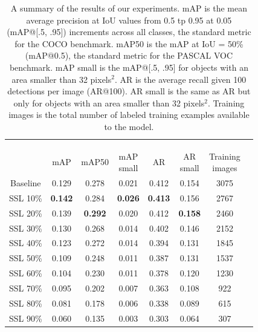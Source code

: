 \documentclass[conference]{IEEEtran}
\begin{document}

\begin{table}[h]
\renewcommand{\arraystretch}{1.3}
\caption{A summary of the results of our experiments. mAP is the mean average precision at IoU values from 0.5 tp 0.95 at 0.05 (mAP@[.5, .95]) increments across all classes, the standard metric for the COCO benchmark. mAP50 is the mAP at IoU = 50\% (mAP@0.5), the standard metric for the PASCAL VOC benchmark. mAP small is the mAP@[.5, .95] for objects with an area smaller than 32 pixels$^2$. AR is the average recall given 100 detections per image (AR@100). AR small is the same as AR but only for objects with an area smaller than 32 pixels$^2$. Training images is the total number of labeled training examples available to the model.}
\label{tab:results}
\centering
\begin{tabular}{|c|c|c|c|c|c|c|c}
\hline
\begin{minipage}{5mm} ~\\ \\ \\ \end{minipage} & mAP & mAP50 & \parbox[c]{7mm}{mAP\\small} & AR & \parbox[c]{7mm}{AR\\small} & \parbox[c]{9mm}{Training\\images} \\ \hline \hline
{}
Baseline & 0.129 & 0.278 & 0.021 & 0.412 & 0.154 & 3075 \\ \hline
SSL 10\% & \textbf{0.142} & 0.284 & \textbf{0.026} & \textbf{0.413} & 0.156 & 2767 \\ \hline
SSL 20\% & 0.139 & \textbf{0.292} & 0.020 & 0.412 & \textbf{0.158} & 2460 \\ \hline
SSL 30\% & 0.130 & 0.268 & 0.014 & 0.402 & 0.146 & 2152 \\ \hline
SSL 40\% & 0.123 & 0.272 & 0.014 & 0.394 & 0.131 & 1845 \\ \hline
{}
SSL 50\% & 0.109 & 0.248 & 0.011 & 0.387 & 0.131 & 1537 \\ \hline
SSL 60\% & 0.104 & 0.230 & 0.011 & 0.378 & 0.120 & 1230 \\ \hline
SSL 70\% & 0.095 & 0.202 & 0.007 & 0.363 & 0.108 & 922 \\ \hline
SSL 80\% & 0.081 & 0.178 & 0.006 & 0.338 & 0.089 & 615 \\ \hline
SSL 90\% & 0.060 & 0.135 & 0.003 & 0.303 & 0.064 & 307 \\
\hline
\end{tabular}
\end{table}
\end{document}
